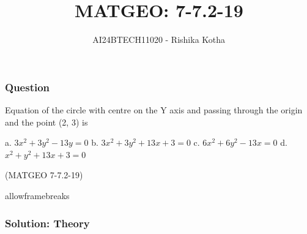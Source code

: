 \documentclass{beamer}
\begin{document}
\title{MATGEO: 7-7.2-19}
\author{AI24BTECH11020 - Rishika Kotha$^{}$%
}
\frame{\titlepage}

\begin{frame}
\frametitle{Question}
Equation of the circle with centre on the Y axis and passing through the origin and the point (2, 3) is
 \\
\begin{enumerate}
    a. $3x^2+3y^2-13y=0$
    b. $3x^2+3y^2+13x+3=0$
    c. $6x^2+6y^2-13x=0$
    d. $x^2+y^2+13x+3=0$
\end{enumerate} \hfill(MATGEO 7-7.2-19)
\end{frame}


\begin{frame}{allowframebreaks}
\frametitle{Solution: Theory}
        \begin{table}[h!]
    \centering
    
    \label{7-7.2-19}
        \end{table}
\end{frame}
\end{document}

